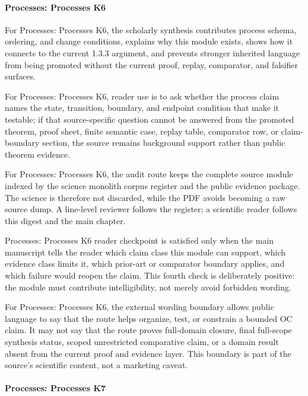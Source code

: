 \paragraph{Processes: Processes K6}

For Processes: Processes K6, the scholarly synthesis contributes process schema, ordering, and change conditions, explains why this module exists, shows how it connects to the current 1.3.3 argument, and prevents stronger inherited language from being promoted without the current proof, replay, comparator, and falsifier surfaces.


For Processes: Processes K6, reader use is to ask whether the process claim names the state, transition, boundary, and endpoint condition that make it testable; if that source-specific question cannot be answered from the promoted theorem, proof sheet, finite semantic case, replay table, comparator row, or claim-boundary section, the source remains background support rather than public theorem evidence.


For Processes: Processes K6, the audit route keeps the complete source module indexed by the science monolith corpus register and the public evidence package. The science is therefore not discarded, while the PDF avoids becoming a raw source dump. A line-level reviewer follows the register; a scientific reader follows this digest and the main chapter.


Processes: Processes K6 reader checkpoint is satisfied only when the main manuscript tells the reader which claim class this module can support, which evidence class limits it, which prior-art or comparator boundary applies, and which failure would reopen the claim. This fourth check is deliberately positive: the module must contribute intelligibility, not merely avoid forbidden wording.


For Processes: Processes K6, the external wording boundary allows public language to say that the route helps organize, test, or constrain a bounded OC claim. It may not say that the route proves full-domain closure, final full-scope synthesis status, scoped unrestricted comparative claim, or a domain result absent from the current proof and evidence layer. This boundary is part of the source's scientific content, not a marketing caveat.


\paragraph{Processes: Processes K7}

